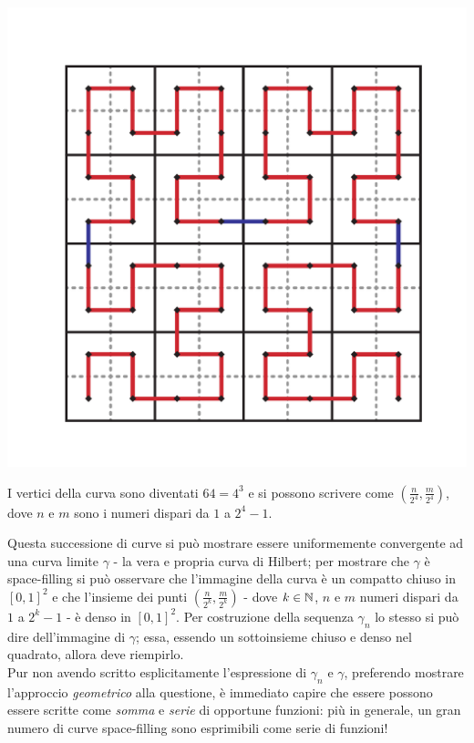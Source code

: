 \begin{itemize}
\begin{center}
		\includegraphics[trim=1.8cm 1.8cm 1.8cm 1.8cm, clip, scale=0.25]{images/hilbert3.pdf}
	\end{center}
	I vertici della curva sono diventati $64=4^3$ e si possono scrivere come $\left(\frac{n}{2^4},\frac{m}{2^4}\right)$, dove $n$ e  $m$ sono i numeri dispari da $1$ a $2^4-1$.
\end{itemize}
Questa successione di curve si può mostrare essere uniformemente convergente ad una curva limite $\gamma$ - la vera e propria curva di Hilbert; per mostrare che $\gamma$ è space-filling si può osservare che l'immagine della curva è un compatto chiuso in $\left[0,1\right]^2$ e che l'insieme dei punti $\left(\frac{n}{2^k},\frac{m}{2^k}\right)$ - dove $k\in\mathbb{N}$, $n$ e $m$ numeri dispari da $1$ a $2^k-1$ - è denso in $\left[0,1\right]^2$. Per costruzione della sequenza $\gamma_n$ lo stesso si può dire dell'immagine di $\gamma$; essa, essendo un sottoinsieme chiuso e denso nel quadrato, allora deve riempirlo.\\
Pur non avendo scritto esplicitamente l'espressione di $\gamma_n$ e $\gamma$, preferendo mostrare l'approccio \textit{geometrico} alla questione, è immediato capire che essere possono essere scritte come \textit{somma} e \textit{serie} di opportune funzioni: più in generale, un gran numero di curve space-filling sono esprimibili come serie di funzioni!